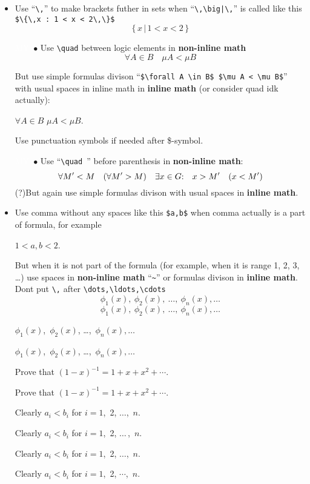 \documentclass[a5paper,openany,9pt]{extbook}
\begin{document}
\begin{itemize}
\item
Use ``\verb=\,='' to make brackets futher in sets when ``\verb=\,\big|\,='' is called like this \verb|$\{\,x : 1 < x < 2\,\}$|
$$\{\,x \,\big|\, 1 < x < 2\,\}$$

\item[\colorbox{prpl}{\textcolor{white}{MY}}\ $\bullet$]
Use \verb|\quad| between logic elements in \textbf{non-inline math}
$$
\forall A \in B \quad \mu A < \mu B 
$$

But use simple formulas divison ``\verb=$\forall A \in B$ $\mu A < \mu B$='' with usual spaces in inline math in \textbf{inline math} (or consider quad idk actually): 
\begin{center}
$\forall A \in B$ $\mu A < \mu B$.
\end{center}
Use punctuation symbols if needed after \$-symbol.
\item[\colorbox{prpl}{\textcolor{white}{MY}}\ $\bullet$]
Use ``\verb|\quad |'' before parenthesis in \textbf{non-inline math}:
$$
\forall M' < M \quad (\forall M' > M)\quad \exists x\in G{:}\quad x>M' \quad (x<M')
$$
(?)But again use simple formulas divison with usual spaces in \textbf{inline math}.

\item 
Use comma without any spaces like this \verb|$a,b$| when comma actually is a part of formula, for example
\begin{center}
$1<a,b<2$. 
\end{center}
But when it is not part of the formula (for example, when it is range 1, 2, 3, \dots) use spaces in \textbf{non-inline math} ``\verb|~|'' or formulas divison in \textbf{inline math}. Dont put \verb|\,| after \verb|\dots,\ldots,\cdots|
$$
\phi_1(x), \ \phi_2(x),\ \ldots,\ \phi_n(x), \ldots
$$
$$
\phi_1(x), \ \phi_2(x),\ \dots,\ \phi_n(x), \ldots
$$

$\phi_1(x)$,~$\phi_2(x)$, \ldots,~$\phi_n(x), \ldots$

$\phi_1(x)$,~$\phi_2(x)$, \dots,~$\phi_n(x), \ldots$

Prove that $(1-x)^{-1}=1+x+x^2+\cdots$.

Prove that $(1-x)^{-1}=1+x+x^2+\cdots$.

Clearly $a_i<b_i$ for $i=1$,~2, $\ldots$,~$n$.

Clearly $a_i<b_i$ for $i=1$,~2, $\dots\,$,~$n$.

Clearly $a_i<b_i$ for $i=1$,~2, $\dots$,~$n$.

Clearly $a_i<b_i$ for $i=1$,~2, $\cdots$,~$n$.



\end{itemize}
\end{document}
